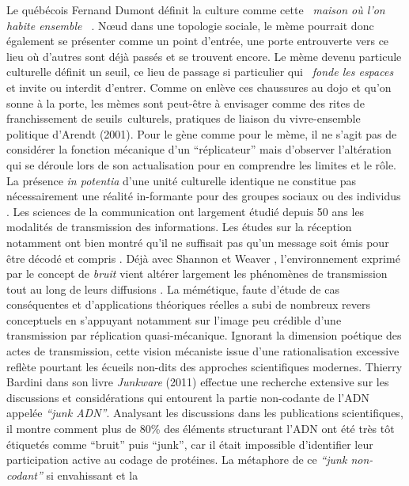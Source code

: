  Le qu\'eb\'ecois Fernand Dumont d\'efinit la culture comme cette \textit{{\guillemotleft}~maison o\`u l{\textquoteright}on habite ensemble~{\guillemotright} }\cite{Dumont1993}. N{\oe}ud dans une topologie sociale, le m\`eme pourrait donc \'egalement se pr\'esenter comme un point d{\textquoteright}entr\'ee, une porte entrouverte vers ce lieu o\`u d{\textquoteright}autres sont d\'ej\`a pass\'es et se trouvent encore. Le m\`eme devenu particule culturelle d\'efinit un seuil, ce lieu de passage si particulier qui \textit{{\guillemotleft}~fonde les espaces~{\guillemotright}} \cite{Bonnin2000} et invite ou interdit d{\textquoteright}entrer. Comme on enl\`eve ces chaussures au dojo et qu{\textquoteright}on sonne \`a la porte, les m\`emes sont peut-\^etre \`a envisager comme des rites de franchissement de seuils~culturels, pratiques de liaison du vivre-ensemble politique d{\textquoteright}Arendt (2001). Pour le g\`ene comme pour le m\`eme, il ne s{\textquoteright}agit pas de consid\'erer la fonction m\'ecanique d{\textquoteright}un {\textquotedblleft}r\'eplicateur{\textquotedblright} mais d{\textquoteright}observer l{\textquoteright}alt\'eration qui se d\'eroule lors de son actualisation pour en comprendre les limites et le r\^ole. La pr\'esence \textit{in potentia }d{\textquoteright}une unit\'e culturelle identique ne constitue pas n\'ecessairement une r\'ealit\'e in-formante pour des groupes sociaux ou des individus \cite{Lissack2004}. Les sciences de la communication ont largement \'etudi\'e depuis 50 ans les modalit\'es de transmission des informations. Les \'etudes sur la r\'eception notamment ont bien montr\'e qu{\textquoteright}il ne suffisait pas qu{\textquoteright}un message soit \'emis pour \^etre d\'ecod\'e et compris \cite{Katz1989}. D\'ej\`a avec Shannon et Weaver \cite{Jakobson1960}, l{\textquoteright}environnement exprim\'e par le concept de\textit{ bruit }vient alt\'erer largement les ph\'enom\`enes de transmission tout au long de leurs diffusions \cite{Chandler2008}. La m\'em\'etique, faute d{\textquoteright}\'etude de cas cons\'equentes et d{\textquoteright}applications th\'eoriques r\'eelles \cite{Jouxtel2014} a subi de nombreux revers conceptuels en s{\textquoteright}appuyant notamment sur l{\textquoteright}image peu cr\'edible d{\textquoteright}une transmission par r\'eplication quasi-m\'ecanique. Ignorant la dimension po\'etique des actes de transmission, cette vision m\'ecaniste issue d{\textquoteright}une rationalisation excessive refl\`ete pourtant les \'ecueils non-dits des approches scientifiques modernes. Thierry Bardini dans son livre \textit{Junkware }(2011) effectue une recherche extensive sur les discussions et consid\'erations qui entourent la partie non-codante de l{\textquoteright}ADN appel\'ee \textit{{\textquotedblleft}junk ADN{\textquotedblright}}. Analysant les discussions dans les publications scientifiques, il montre comment plus de 80\% des \'el\'ements structurant l{\textquoteright}ADN ont \'et\'e tr\`es t\^ot \'etiquet\'es comme {\textquotedblleft}bruit{\textquotedblright} puis {\textquotedblleft}junk{\textquotedblright}, car il \'etait impossible d{\textquoteright}identifier leur participation active au codage de prot\'eines. La m\'etaphore de ce \textit{{\textquotedblleft}junk non-codant{\textquotedblright} }si envahissant et la 